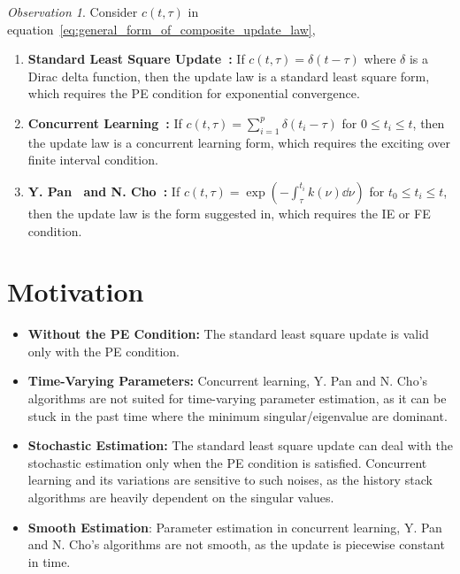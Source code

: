 \documentclass[nobib]{my-handout}
\theoremstyle{definition}
\theoremstyle{remark}
\newtheorem{observation}{Observation}
\begin{document}
\begin{observation}
	Consider $c(t, \tau)$ in
	equation~\eqref{eq:general_form_of_composite_update_law}, 
	\begin{enumerate}
		\item \textbf{Standard Least Square Update~\cite{slotine_applied_1991}:} If
			$c(t, \tau) = \delta(t-\tau)$ where $\delta$ is a Dirac delta function,
			then the update law is a standard least square form, which requires the
			PE condition for exponential convergence.
		\item \textbf{Concurrent Learning~\cite{chowdhary_exponential_2014}:} If
			$c(t, \tau) = \sum_{i=1}^p \delta(t_i - \tau)$ for $0 \le t_i \le t$,
			then the update law is a concurrent learning form, which requires the
			exciting over finite interval condition.
		\item \textbf{Y. Pan~\cite{pan_composite_2018} and N.
			Cho~\cite{cho_composite_2018}:} If $c(t, \tau) = \exp(- \int_\tau^{t_i}
			k(\nu) \dd{\nu})$ for $t_0 \le t_i \le t$, then the update law is the
			form suggested in, which requires the IE or FE condition.
	\end{enumerate}
\end{observation}


\section{Motivation}

\begin{itemize}
	\item \textbf{Without the PE Condition:} The standard least square update is
		valid only with the PE condition.
	\item \textbf{Time-Varying Parameters:} Concurrent learning, Y. Pan and N.
		Cho's algorithms are not suited for time-varying parameter estimation, as
		it can be stuck in the past time where the minimum singular/eigenvalue are
		dominant.
	\item \textbf{Stochastic Estimation:} The standard least square update can
		deal with the stochastic estimation only when the PE condition is satisfied. Concurrent learning and
		its variations are sensitive to such noises, as the history stack
		algorithms are heavily dependent on the singular values.
	\item \textbf{Smooth Estimation}: Parameter estimation in concurrent
		learning, Y. Pan and N. Cho's algorithms are not smooth, as the update is
		piecewise constant in time.
\end{itemize}
\end{document}
